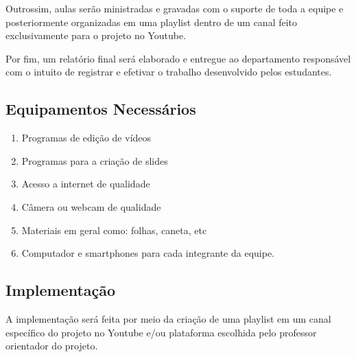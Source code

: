 \documentclass[a4paper,10pt]{article} %
\begin{document}
Outrossim, aulas serão ministradas e gravadas com o suporte de toda a  equipe e posteriormente organizadas em uma playlist dentro de um canal feito exclusivamente para o projeto no Youtube.
 
Por fim, um relatório final será elaborado e entregue ao departamento responsável com o intuito de registrar e efetivar o trabalho desenvolvido pelos estudantes.

\subsection{Equipamentos Necessários}

\begin{enumerate}
 \item Programas de edição de vídeos 
 \item Programas para a criação de slides
 \item Acesso a internet de qualidade
 \item Câmera ou webcam de qualidade
 \item Materiais em geral como: folhas, caneta, etc
 \item Computador e smartphones para cada integrante da equipe.
\end{enumerate}

\subsection{Implementação}
 A implementação será feita por meio da criação de uma playlist em um canal específico do projeto no Youtube e/ou plataforma escolhida pelo professor orientador do projeto.


\end{document}
